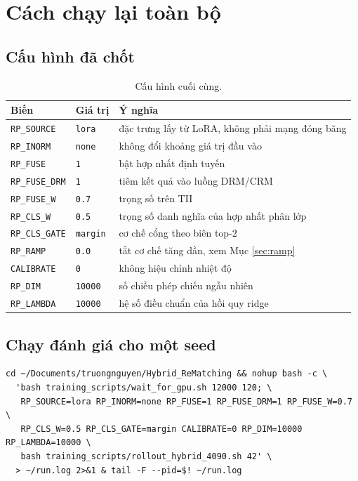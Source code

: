 \documentclass[11pt,a4paper]{article}
\begin{document}
\section{Cách chạy lại toàn bộ}

\subsection{Cấu hình đã chốt}

\begin{table}[htbp]
\centering
\caption{Cấu hình cuối cùng.}
\begin{tabular}{lll}
\toprule
Biến & Giá trị & Ý nghĩa \\
\midrule
\texttt{RP\_SOURCE}   & \texttt{lora}   & đặc trưng lấy từ LoRA, không phải mạng đóng băng \\
\texttt{RP\_INORM}    & \texttt{none}   & không đổi khoảng giá trị đầu vào \\
\texttt{RP\_FUSE}     & \texttt{1}      & bật hợp nhất định tuyến \\
\texttt{RP\_FUSE\_DRM}& \texttt{1}      & tiêm kết quả vào luồng DRM/CRM \\
\texttt{RP\_FUSE\_W}  & \texttt{0.7}    & trọng số trên TII \\
\texttt{RP\_CLS\_W}   & \texttt{0.5}    & trọng số danh nghĩa của hợp nhất phân lớp \\
\texttt{RP\_CLS\_GATE}& \texttt{margin} & cơ chế cổng theo biên top-2 \\
\texttt{RP\_RAMP}     & \texttt{0.0}    & tắt cơ chế tăng dần, xem Mục \ref{sec:ramp} \\
\texttt{CALIBRATE}    & \texttt{0}      & không hiệu chỉnh nhiệt độ \\
\texttt{RP\_DIM}      & \texttt{10000}  & số chiều phép chiếu ngẫu nhiên \\
\texttt{RP\_LAMBDA}   & \texttt{10000}  & hệ số điều chuẩn của hồi quy ridge \\
\bottomrule
\end{tabular}
\end{table}

\subsection{Chạy đánh giá cho một seed}

\begin{footnotesize}
\begin{verbatim}
cd ~/Documents/truongnguyen/Hybrid_ReMatching && nohup bash -c \
  'bash training_scripts/wait_for_gpu.sh 12000 120; \
   RP_SOURCE=lora RP_INORM=none RP_FUSE=1 RP_FUSE_DRM=1 RP_FUSE_W=0.7 \
   RP_CLS_W=0.5 RP_CLS_GATE=margin CALIBRATE=0 RP_DIM=10000 RP_LAMBDA=10000 \
   bash training_scripts/rollout_hybrid_4090.sh 42' \
  > ~/run.log 2>&1 & tail -F --pid=$! ~/run.log
\end{verbatim}
\end{footnotesize}
\end{document}
